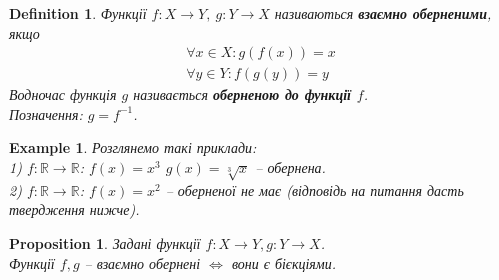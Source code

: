 \documentclass[a4paper, 14pt]{extarticle}
\theoremstyle{theoremdd}
\theoremstyle{theoremdd}
\newtheorem{definition}[theorem]{Definition}
\theoremstyle{theoremdd}
\theoremstyle{theoremdd}
\theoremstyle{theoremdd}
\newtheorem{example}[theorem]{Example}
\theoremstyle{theoremdd}
\theoremstyle{theoremdd}
\theoremstyle{theoremdd}
\theoremstyle{theoremdd}
\newtheorem{proposition}[theorem]{Proposition}
\theoremstyle{theoremdd}
\theoremstyle{theoremdd}
\theoremstyle{theoremdd}
\theoremstyle{theoremdd}
\theoremstyle{theoremdd}
\theoremstyle{theoremdd}
\begin{document}
	\begin{definition}
	Функції $f \colon X \to Y,\ g \colon Y \to X$ називаються \textbf{взаємно оберненими}, якщо
	\begin{align*}
	\forall x \in X: g(f(x)) = x \\
	\forall y \in Y: f(g(y)) = y
	\end{align*}
	Водночас функція $g$ називається \textbf{оберненою до функції $f$}.\\
	Позначення: $g = f^{-1}$.
\begin{figure}[H]
\end{figure}
	\end{definition}
	
	\begin{example} Розглянемо такі приклади:\\
	1) $f \colon \mathbb{R} \to \mathbb{R}$: \qquad $f(x) = x^3$ \qquad $g(x) = \sqrt[3]{x}$ -- обернена. \\
	2) $f \colon \mathbb{R} \to \mathbb{R}$: \qquad
	$f(x) = x^2$ -- оберненої не має (відповідь на питання дасть твердження нижче).
	\end{example}
	
	\begin{proposition}
	Задані функції $f \colon X \to Y, g \colon Y \to X$.\\
	Функції $f,g$ -- взаємно обернені $\iff$ вони є бієкціями.
	\end{proposition}
	
\end{document}
